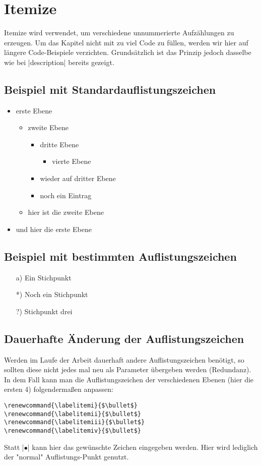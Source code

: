 \section{Itemize}
Itemize wird verwendet, um verschiedene unnummerierte Aufzählungen zu erzeugen. 
Um das Kapitel nicht mit zu viel Code zu füllen, werden wir hier auf längere Code-Beispiele verzichten. Grundsätzlich ist das Prinzip jedoch dasselbe wie bei \befehl|description| bereits gezeigt.

\subsection{Beispiel mit Standardauflistungszeichen}
\begin{itemize}
    \item erste Ebene
    \begin{itemize}
        \item zweite Ebene
        \begin{itemize}
            \item dritte Ebene
            \begin{itemize}
                \item vierte Ebene
            \end{itemize}
            \item wieder auf dritter Ebene 
            \item noch ein Eintrag 
        \end{itemize}
        \item hier ist die zweite Ebene
    \end{itemize}
    \item und hier die erste Ebene
\end{itemize}

\subsection{Beispiel mit bestimmten Auflistungszeichen}
\begin{itemize}
    \item[a)] Ein Stichpunkt
    \item[*)] Noch ein Stichpunkt
    \item[?)] Stichpunkt drei
\end{itemize}

\subsection{Dauerhafte Änderung der Auflistungszeichen}
Werden im Laufe der Arbeit dauerhaft andere Auflistungszeichen benötigt, so sollten diese nicht jedes mal neu als Parameter übergeben werden (Redundanz). 
In dem Fall kann man die Auflistungszeichen der verschiedenen Ebenen (hier die ersten 4) folgendermaßen anpassen:
\begin{lstlisting}
\renewcommand{\labelitemi}{$\bullet$}
\renewcommand{\labelitemii}{$\bullet$}
\renewcommand{\labelitemiii}{$\bullet$}
\renewcommand{\labelitemiv}{$\bullet$}
\end{lstlisting}
Statt \befehl|$\bullet$| kann hier das gewünschte Zeichen eingegeben werden. Hier wird lediglich der "normal" Auflistungs-Punkt genutzt.

